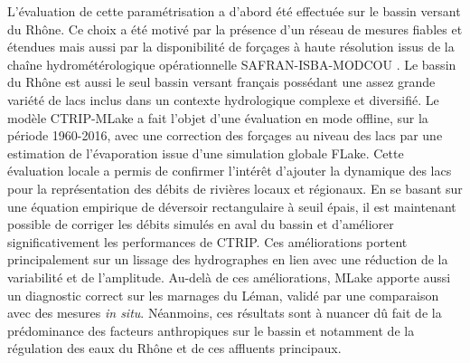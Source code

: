 L'évaluation de cette paramétrisation a d'abord été effectuée sur le bassin versant du Rhône. Ce choix a été motivé par la présence d'un réseau de mesures fiables et étendues mais aussi par la disponibilité de forçages à haute résolution issus de la chaîne hydrométérologique opérationnelle SAFRAN-ISBA-MODCOU \citep{lemoigne2020}. Le bassin du Rhône est aussi le seul bassin versant français possédant une assez grande variété de lacs inclus dans un contexte hydrologique complexe et diversifié. Le modèle CTRIP-MLake a fait l'objet d'une évaluation en mode offline, sur la période 1960-2016, avec une correction des forçages au niveau des lacs par une estimation de l'évaporation issue d'une simulation globale FLake. Cette évaluation locale a permis de confirmer l'intérêt d'ajouter la dynamique des lacs pour la représentation des débits de rivières locaux et régionaux. En se basant sur une équation empirique de déversoir rectangulaire à seuil épais, il est maintenant possible de corriger les débits simulés en aval du bassin et d'améliorer significativement les performances de CTRIP. Ces améliorations portent principalement sur un lissage des hydrographes en lien avec une réduction de la variabilité et de l'amplitude. Au-delà de ces améliorations, MLake apporte aussi un diagnostic correct sur les marnages du Léman, validé par une comparaison avec des mesures \textit{in situ}. Néanmoins, ces résultats sont à nuancer dû fait de la prédominance des facteurs anthropiques sur le bassin et notamment de la régulation des eaux du Rhône et de ces affluents principaux.\\

